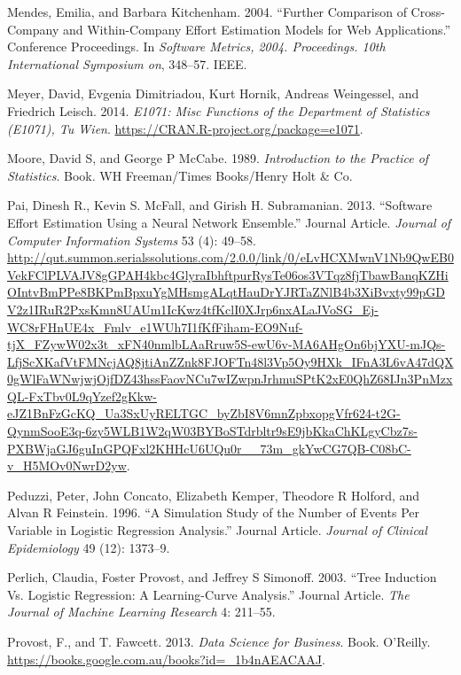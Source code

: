 \documentclass[]{elsarticle} %
\begin{document}
\hypertarget{ref-Mendes2004}{}
Mendes, Emilia, and Barbara Kitchenham. 2004. ``Further Comparison of
Cross-Company and Within-Company Effort Estimation Models for Web
Applications.'' Conference Proceedings. In \emph{Software Metrics, 2004.
Proceedings. 10th International Symposium on}, 348--57. IEEE.

\hypertarget{ref-e1071}{}
Meyer, David, Evgenia Dimitriadou, Kurt Hornik, Andreas Weingessel, and
Friedrich Leisch. 2014. \emph{E1071: Misc Functions of the Department of
Statistics (E1071), Tu Wien}.
\url{https://CRAN.R-project.org/package=e1071}.

\hypertarget{ref-Moore1989}{}
Moore, David S, and George P McCabe. 1989. \emph{Introduction to the
Practice of Statistics}. Book. WH Freeman/Times Books/Henry Holt \& Co.

\hypertarget{ref-Pai2013}{}
Pai, Dinesh R., Kevin S. McFall, and Girish H. Subramanian. 2013.
``Software Effort Estimation Using a Neural Network Ensemble.'' Journal
Article. \emph{Journal of Computer Information Systems} 53 (4): 49--58.
\url{http://qut.summon.serialssolutions.com/2.0.0/link/0/eLvHCXMwnV1Nb9QwEB0VekFClPLVAJV8gGPAH4kbc4GlyraIbhftpurRysTe06os3VTqz8fjTbawBanqKZHiOIntvBmPPe8BKPmBpxuYgMHsmgALqtHauDrYJRTaZNlB4b3XiBvxty99pGDV2z1IRuR2PxsKmn8UAUm1IcKwz4tfKclI0XJrp6nxALaJVoSG_Ej-WC8rFHnUE4x_Fmlv_e1WUh7I1fKfFiham-EO9Nuf-tjX_FZywW02x3t_xFN40nmlbLAaRruw5S-ewU6v-MA6AHgOn6bjYXU-mJQs-LfjScXKafVtFMNcjAQ8jtiAnZZnk8FJOFTn48l3Vp5Oy9HXk_IFnA3L6vA47dQX0gWlFaWNwjwjOjfDZ43hssFaovNCu7wIZwpnJrhmuSPtK2xE0QhZ68IJn3PnMzxQL-FxTbv0L9qYzef2gKkw-eJZ1BnFzGcKQ_Ua3SxUyRELTGC_byZbI8V6mnZpbxopgVfr624-t2G-QynmSooE3q-6zy5WLB1W2qW03BYBoSTdrbltr9sE9jbKkaChKLgyCbz7s-PXBWjaGJ6guInGPQFxl2KHHcU6UQu0r__73m_gkYwCG7QB-C08bC-v_H5MOv0NwrD2yw}.

\hypertarget{ref-Peduzzi1996}{}
Peduzzi, Peter, John Concato, Elizabeth Kemper, Theodore R Holford, and
Alvan R Feinstein. 1996. ``A Simulation Study of the Number of Events
Per Variable in Logistic Regression Analysis.'' Journal Article.
\emph{Journal of Clinical Epidemiology} 49 (12): 1373--9.

\hypertarget{ref-Perlich2003}{}
Perlich, Claudia, Foster Provost, and Jeffrey S Simonoff. 2003. ``Tree
Induction Vs. Logistic Regression: A Learning-Curve Analysis.'' Journal
Article. \emph{The Journal of Machine Learning Research} 4: 211--55.

\hypertarget{ref-Provost2013}{}
Provost, F., and T. Fawcett. 2013. \emph{Data Science for Business}.
Book. O'Reilly. \url{https://books.google.com.au/books?id=_1b4nAEACAAJ}.
\end{document}
